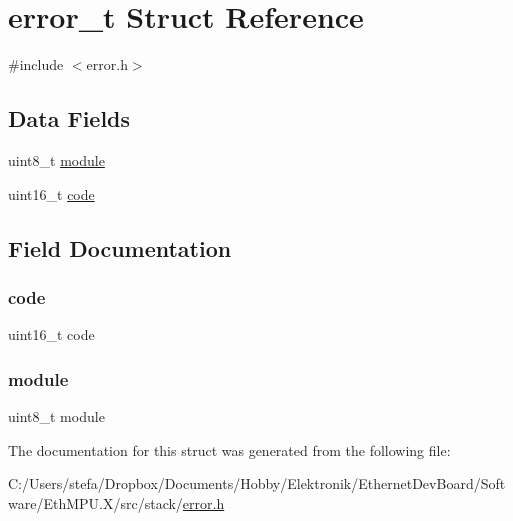 \hypertarget{structerror__t}{}\section{error\+\_\+t Struct Reference}
\label{structerror__t}


{\ttfamily \#include $<$error.\+h$>$}

\subsection*{Data Fields}
\begin{DoxyCompactItemize}
\item 
uint8\+\_\+t \mbox{\hyperlink{structerror__t_a8dc5dbc13ebe8eb221673980e57465b6}{module}}
\item 
uint16\+\_\+t \mbox{\hyperlink{structerror__t_a70008c0b7822b172472813e6730ea565}{code}}
\end{DoxyCompactItemize}


\subsection{Field Documentation}
\mbox{\label{structerror__t_a70008c0b7822b172472813e6730ea565}} 
\subsubsection{\texorpdfstring{code}{code}}
{\footnotesize\ttfamily uint16\+\_\+t code}

\mbox{\label{structerror__t_a8dc5dbc13ebe8eb221673980e57465b6}} 
\subsubsection{\texorpdfstring{module}{module}}
{\footnotesize\ttfamily uint8\+\_\+t module}



The documentation for this struct was generated from the following file\+:\begin{DoxyCompactItemize}
\item 
C\+:/\+Users/stefa/\+Dropbox/\+Documents/\+Hobby/\+Elektronik/\+Ethernet\+Dev\+Board/\+Software/\+Eth\+M\+P\+U.\+X/src/stack/\mbox{\hyperlink{error_8h}{error.\+h}}\end{DoxyCompactItemize}
